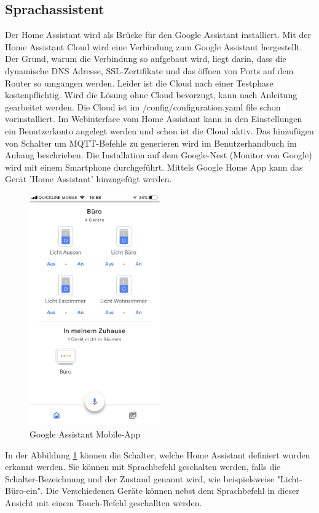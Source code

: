 \subsection{Sprachassistent}
Der Home Assistant wird als Brücke für den Google Assistant installiert. Mit der Home Assistant Cloud wird eine Verbindung zum Google Assistant hergestellt. Der Grund, warum die Verbindung so aufgebaut wird, liegt darin, dass die dynamische DNS Adresse, SSL-Zertifikate und das öffnen von Ports auf dem Router so umgangen werden. Leider ist die Cloud nach einer Testphase kostenpflichtig. Wird die Lösung ohne Cloud bevorzugt, kann nach Anleitung \cite{assistant_google_nodate} gearbeitet werden. Die Cloud ist im /config/configuration.yaml file schon vorinstalliert. Im Webinterface vom Home Assistant kann in den Einstellungen ein Benutzerkonto angelegt werden und schon ist die Cloud aktiv. Das hinzufügen von Schalter um MQTT-Befehle zu generieren wird im Benutzerhandbuch im Anhang beschrieben. Die Installation auf dem Google-Nest (Monitor von Google) wird mit einem Smartphone durchgeführt. Mittels Google Home App kann das Gerät 'Home Assistant' hinzugefügt werden.
\begin{figure}[H]
	\centering
	\includegraphics[width=0.5\textwidth]{graphics/GoogleAssistant.png}
	\caption{Google Assistant Mobile-App}
	\label{pic: GoogleAssistant}
\end{figure}   
In der Abbildung \ref{pic: GoogleAssistant} können die Schalter, welche Home Assistant definiert wurden erkannt werden. Sie können mit Sprachbefehl geschalten werden, falls die Schalter-Bezeichnung und der Zustand genannt wird, wie beispielsweise "Licht-Büro-ein". Die Verschiedenen Geräte können nebst dem Sprachbefehl in dieser Ansicht mit einem Touch-Befehl geschallten werden.
